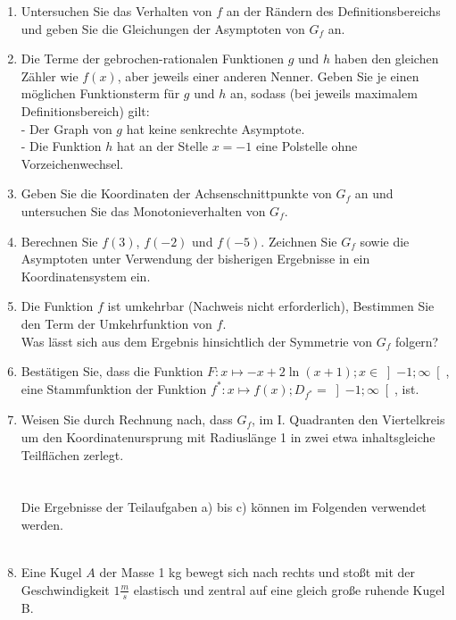 \documentclass[a4paper,12pt]{article}
\begin{document}
\begin{enumerate}[label={\alph*)}]
  \item Untersuchen Sie das Verhalten von $f$ an der Rändern des Definitionsbereichs und geben Sie die Gleichungen der Asymptoten von $G_f$ an.
  \item Die Terme der gebrochen-rationalen Funktionen $g$ und $h$ haben den gleichen Zähler wie $f(x)$, aber jeweils einer anderen Nenner. Geben Sie je einen möglichen Funktionsterm für $g$ und $h$ an, sodass (bei jeweils maximalem Definitionsbereich) gilt:\\
  - Der Graph von $g$ hat keine senkrechte Asymptote.\\
  - Die Funktion $h$ hat an der Stelle $x = -1$ eine Polstelle ohne Vorzeichenwechsel.
  \item Geben Sie die Koordinaten der Achsenschnittpunkte von $G_f$ an und untersuchen Sie das Monotonieverhalten von $G_f$. 
  \item Berechnen Sie $f(3)$, $f(-2)$ und $f(-5)$. Zeichnen Sie $G_f$ sowie die Asymptoten unter Verwendung der bisherigen Ergebnisse in ein Koordinatensystem ein.

  \item Die Funktion $f$ ist umkehrbar (Nachweis nicht erforderlich), Bestimmen Sie den Term der Umkehrfunktion von $f$.\\
  Was lässt sich aus dem Ergebnis hinsichtlich der Symmetrie von $G_f$ folgern?

\item Bestätigen Sie, dass die Funktion $F: x\mapsto -x+2 \ln (x + 1); x \in \left]-1; \infty \right[$, eine Stammfunktion der Funktion $f^*: x\mapsto f(x); D_{f^*}= \left]-1; \infty \right[$, ist. 
\item Weisen Sie durch Rechnung nach, dass $G_f$, im I. Quadranten den Viertelkreis um den Koordinatenursprung mit Radiuslänge 1 in zwei etwa inhaltsgleiche Teilflächen zerlegt.\\
\\
\\
    Die Ergebnisse der Teilaufgaben a) bis c) können im Folgenden verwendet werden.\\
\\

\item Eine Kugel $A$ der Masse 1 kg bewegt sich nach rechts und stoßt mit der Geschwindigkeit $1\frac{m}{s}$ elastisch und zentral auf eine gleich große ruhende Kugel B.


\end{enumerate}
\end{document}
